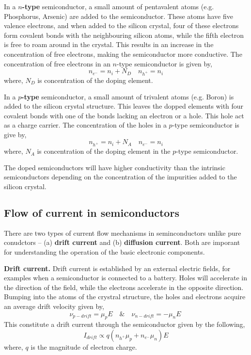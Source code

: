 In a \textbf{$n$-type} semiconductor, a small amount of pentavalent atoms (e.g. Phosphorus, Arsenic) are added to the semiconductor. These atoms have five valence electrons, and when added to the silicon crystal, four of these electrons form covalent bonds with the neighbouring silicon atoms, while the fifth electron is free to roam around in the crystal. This results in an increase in the concentration of free electrons, making the semiconductor more conductive. The concentration of free electrons in an $n$-type semiconductor is given by,
\begin{equation}
    n_{e^-} = n_i + N_D \quad n_{h^+} = n_i
    \label{eq:ch03-n-type-elec-conc}
\end{equation}
where, $N_D$ is concentration of the doping element.

In a \textbf{$p$-type} semiconductor, a small amount of trivalent atoms (e.g. Boron) is added to the silicon crystal structure. This leaves the dopped elements with four covalent bonds with one of the bonds lacking an electron or a hole. This hole act as a charge carrier. The concentration of the holes in a $p$-type semiconductor is give by,
\begin{equation}
    n_{h^+} = n_i + N_A \quad n_{e^-} = n_i
    \label{eq:ch03-p-type-elec-conc}
\end{equation}
where, $N_A$ is concentration of the doping element in the $p$-type semiconductor.

The doped semiconductors will have higher conductivity than the intrinsic semiconductors depending on the concentration of the impurities added to the silicon crystal.

\subsection{Flow of current in semiconductors}
There are two types of current flow mechanisms in seminconductors unlike pure conudctors -- (a) \textbf{drift current} and (b) \textbf{diffusion current}. Both are imporant for understanding the operation of the basic electronic components.

\noindent\textbf{Drift current.} Drift current is established by an external electric fields, for examples when a semiconductor is connected to a battery. Holes will accelerate in the direction of the field, while the electrons accelerate in the opposite direction. Bumping into the atoms of the crystral structure, the holes and electrons acquire an average drift velocity given by,
\begin{equation}
    \nu_{p-drift} = \mu_p E \quad \& \quad \nu_{n-drift} = -\mu_n E\
    \label{eq:ch03-drift-vel}
\end{equation}
This constitute a drift current through the semiconductor given by the following,
\begin{equation}
    I_{drift} \propto q\left(n_{h^+}\mu_p + n_{e^-}\mu_n \right) E
    \label{eq:ch03-drift-current}
\end{equation}
where, $q$ is the magnitude of electron charge.

